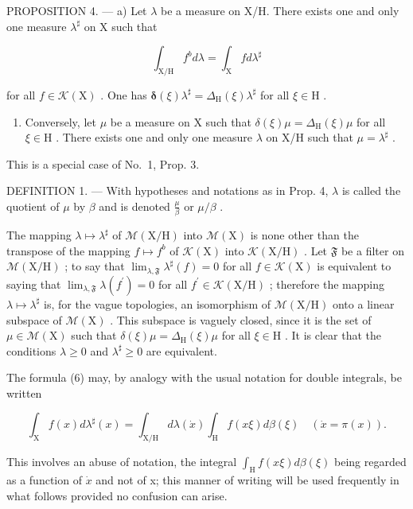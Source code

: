PROPOSITION 4. --- a) Let \(\lambda\) be a measure on X/H. There exists one and only one measure \(\lambda^{\sharp}\) on X such that

\[
\int_ {\mathrm{X} / \mathrm{H}} f ^ {b} d \lambda = \int_ {\mathrm{X}} f d \lambda^ {\sharp}\tag{6}
\]

for all \(f \in \mathcal{K}(\mathrm{X})\) . One has \(\pmb{\delta}(\xi)\lambda^{\sharp} = \Delta_{\mathrm{H}}(\xi)\lambda^{\sharp}\) for all \(\xi \in \mathrm{H}\) .

\begin{enumerate}
\def\labelenumi{\alph{enumi})}
\setcounter{enumi}{1}
\tightlist
\item
  Conversely, let \(\mu\) be a measure on X such that \(\delta(\xi)\mu = \Delta_{\mathrm{H}}(\xi)\mu\) for all \(\xi \in \mathrm{H}\) . There exists one and only one measure \(\lambda\) on X/H such that \(\mu = \lambda^{\sharp}\) .
\end{enumerate}

This is a special case of No.~1, Prop. 3.

DEFINITION 1. --- With hypotheses and notations as in Prop. 4, \(\lambda\) is called the quotient of \(\mu\) by \(\beta\) and is denoted \(\frac{\mu}{\beta}\) or \(\mu/\beta\) .

The mapping \(\lambda \mapsto \lambda^{\sharp}\) of \(\mathcal{M}(\mathrm{X / H})\) into \(\mathcal{M}(\mathrm{X})\) is none other than the transpose of the mapping \(f\mapsto f^{b}\) of \(\mathcal{K}(\mathrm{X})\) into \(\mathcal{K}(\mathrm{X / H})\) . Let \(\mathfrak{F}\) be a filter on \(\mathcal{M}(\mathrm{X / H})\) ; to say that \(\lim_{\lambda ,\mathfrak{F}}\lambda^{\sharp}(f) = 0\) for all \(f\in \mathcal{K}(\mathrm{X})\) is equivalent to saying that \(\lim_{\lambda ,\mathfrak{F}}\lambda (f^{\prime}) = 0\) for all \(f^{\prime}\in \mathcal{K}(\mathrm{X / H})\) ; therefore the mapping \(\lambda \mapsto \lambda^{\sharp}\) is, for the vague topologies, an isomorphism of \(\mathcal{M}(\mathrm{X / H})\) onto a linear subspace of \(\mathcal{M}(\mathrm{X})\) . This subspace is vaguely closed, since it is the set of \(\mu \in \mathcal{M}(\mathrm{X})\) such that \(\delta (\xi)\mu = \Delta_{\mathrm{H}}(\xi)\mu\) for all \(\xi \in \mathrm{H}\) . It is clear that the conditions \(\lambda \geqslant 0\) and \(\lambda^{\sharp}\geqslant 0\) are equivalent.

The formula (6) may, by analogy with the usual notation for double integrals, be written

\[
\int_ {\mathrm{X}} f (x) d \lambda^ {\sharp} (x) = \int_ {\mathrm{X/H}} d \lambda (\dot {x}) \int_ {\mathrm{H}} f (x \xi) d \beta (\xi) \quad (\dot {x} = \pi (x)).\tag{7}
\]

This involves an abuse of notation, the integral \(\int_{\mathrm{H}} f(x\xi) d\beta(\xi)\) being regarded as a function of \(\dot{x}\) and not of x; this manner of writing will be used frequently in what follows provided no confusion can arise.
\relax{}
